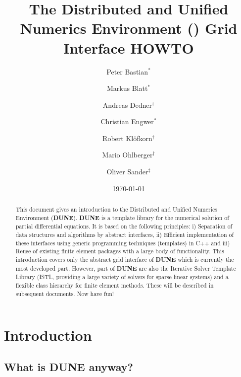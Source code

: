 \documentclass[11pt,a4paper,headinclude,footinclude,DIV16,normalheadings]{scrreprt}
\title{The Distributed and Unified Numerics Environment (\Dune{}) Grid
  Interface HOWTO}
\author{Peter Bastian$^\ast$ \and 
Markus Blatt$^\ast$ \and
Andreas Dedner$^\dagger$ \and 
Christian Engwer$^\ast$ \and  
Robert Kl\"ofkorn$^\dagger$ \and 
Mario Ohlberger$^\dagger$ \and  
Oliver Sander$^\ddagger$}
\date{\today}
\newcommand{\Dune}{{\sf\bfseries DUNE}}
\begin{document}
\maketitle

\begin{abstract}
This document gives an introduction to the Distributed and Unified
Numerics Environment (\Dune). \Dune{} is a template library for the
numerical solution of partial differential equations. It is based on
the following principles: i) Separation of data structures and
algorithms by abstract interfaces, ii) Efficient implementation of these
interfaces using generic programming techniques (templates) in C++ and
iii) Reuse of existing finite element packages with a large body of
functionality. This introduction covers only the abstract grid interface
of \Dune{} which is currently the most developed part. However, part of
\Dune{} are also the Iterative Solver Template Library (ISTL, providing a
large variety of solvers for sparse linear systems) and a flexible class
hierarchy for finite element methods. These will be described in
subsequent documents. Now have fun!
\end{abstract}

\tableofcontents


\chapter{Introduction}

\section{What is \texorpdfstring{\Dune{}}{DUNE} anyway?}
\end{document}
